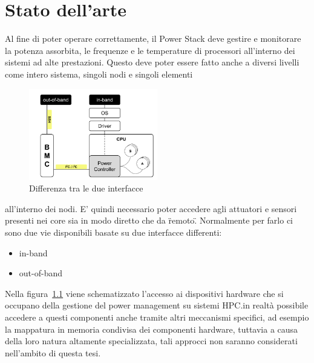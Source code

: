 
\chapter{Stato dell'arte}
Al fine di poter operare correttamente, il Power Stack deve gestire e monitorare la potenza assorbita, le frequenze e le temperature di processori all'interno dei sistemi ad alte prestazioni. Questo deve poter essere fatto anche a diversi livelli come intero sistema, singoli nodi e singoli elementi 
\setlength{\intextsep}{1pt} %
\begin{figure}
    \includegraphics[width=0.5\textwidth]{img/SoA.png}
    \centering
    \caption{Differenza tra le due interfacce}\label{fig:SoAinoutband}
\end{figure}
all'interno dei nodi. E' quindi necessario poter accedere agli attuatori e sensori presenti nei core sia in modo diretto che da \"remoto\". Normalmente per farlo ci sono due vie disponibili basate su due interfacce differenti:
\begin{itemize}
    \item in-band
    \item out-of-band
\end{itemize}
Nella figura~\ref{fig:SoAinoutband} viene schematizzato l'accesso ai dispositivi hardware che si occupano della gestione del power management su sistemi HPC.\@Sarebbe in realtà possibile accedere a questi componenti anche tramite altri meccanismi specifici, ad esempio la mappatura in memoria condivisa dei componenti hardware, tuttavia a causa della loro natura altamente specializzata, tali approcci non saranno considerati nell'ambito di questa tesi.


